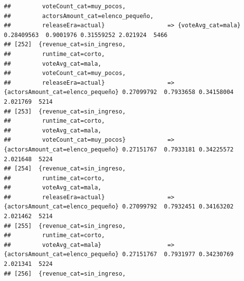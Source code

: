 \documentclass[
]{article}
\begin{document}
\begin{verbatim}
##         voteCount_cat=muy_pocos,                                                                                                
##         actorsAmount_cat=elenco_pequeño,                                                                                        
##         releaseEra=actual}                  => {voteAvg_cat=mala}                0.28409563  0.9001976 0.31559252 2.021924  5466
## [252]  {revenue_cat=sin_ingreso,                                                                                                
##         runtime_cat=corto,                                                                                                      
##         voteAvg_cat=mala,                                                                                                       
##         voteCount_cat=muy_pocos,                                                                                                
##         releaseEra=actual}                  => {actorsAmount_cat=elenco_pequeño} 0.27099792  0.7933658 0.34158004 2.021769  5214
## [253]  {revenue_cat=sin_ingreso,                                                                                                
##         runtime_cat=corto,                                                                                                      
##         voteAvg_cat=mala,                                                                                                       
##         voteCount_cat=muy_pocos}            => {actorsAmount_cat=elenco_pequeño} 0.27151767  0.7933181 0.34225572 2.021648  5224
## [254]  {revenue_cat=sin_ingreso,                                                                                                
##         runtime_cat=corto,                                                                                                      
##         voteAvg_cat=mala,                                                                                                       
##         releaseEra=actual}                  => {actorsAmount_cat=elenco_pequeño} 0.27099792  0.7932451 0.34163202 2.021462  5214
## [255]  {revenue_cat=sin_ingreso,                                                                                                
##         runtime_cat=corto,                                                                                                      
##         voteAvg_cat=mala}                   => {actorsAmount_cat=elenco_pequeño} 0.27151767  0.7931977 0.34230769 2.021341  5224
## [256]  {revenue_cat=sin_ingreso,                                                                                                

\end{verbatim}
\end{document}

